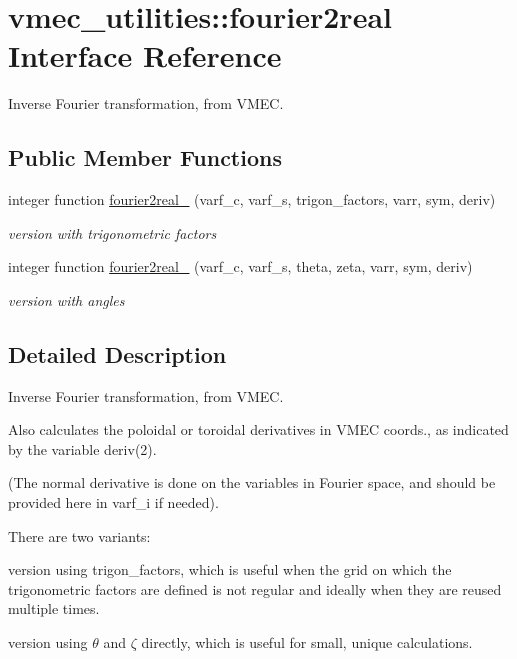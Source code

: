 \hypertarget{interfacevmec__utilities_1_1fourier2real}{}\section{vmec\+\_\+utilities\+:\+:fourier2real Interface Reference}
\label{interfacevmec__utilities_1_1fourier2real}


Inverse Fourier transformation, from V\+M\+EC.  


\subsection*{Public Member Functions}
\begin{DoxyCompactItemize}
\item 
integer function \hyperlink{interfacevmec__utilities_1_1fourier2real_a5e88c64e893bd56ad8e19f6c66c7f62a}{fourier2real\+\_} (varf\+\_\+c, varf\+\_\+s, trigon\+\_\+factors, varr, sym, deriv)
\begin{DoxyCompactList}\small\item\em version with trigonometric factors \end{DoxyCompactList}\item 
integer function \hyperlink{interfacevmec__utilities_1_1fourier2real_a6fc4707ce8d461b9fdee24e63c9556ed}{fourier2real\+\_} (varf\+\_\+c, varf\+\_\+s, theta, zeta, varr, sym, deriv)
\begin{DoxyCompactList}\small\item\em version with angles \end{DoxyCompactList}\end{DoxyCompactItemize}


\subsection{Detailed Description}
Inverse Fourier transformation, from V\+M\+EC. 

Also calculates the poloidal or toroidal derivatives in V\+M\+EC coords., as indicated by the variable {\ttfamily deriv(2)}.

(The normal derivative is done on the variables in Fourier space, and should be provided here in {\ttfamily varf\+\_\+i} if needed).

There are two variants\+:
\begin{DoxyEnumerate}
\item version using trigon\+\_\+factors, which is useful when the grid on which the trigonometric factors are defined is not regular and ideally when they are reused multiple times.
\item version using $\theta$ and $\zeta$ directly, which is useful for small, unique calculations.
\end{DoxyEnumerate}

